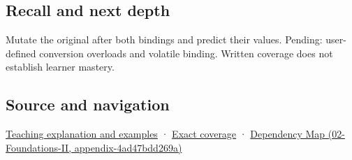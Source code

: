 \subsection{Recall and next depth}\label{recall-and-next-depth}

Mutate the original after both bindings and predict their values. Pending: user-defined conversion overloads and volatile binding. Written coverage does not establish learner mastery.

\subsection{Source and navigation}\label{source-and-navigation}

\href{Continuous\%20Notes/Computing\%20Foundations\%20-\%20From\%20Bits\%20to\%20C++\%20and\%20Systems\%20APIs\#Binding\%20chooses\%20a\%20referent,\%20not\%20always\%20the\%20one\%20you\%20imagined}{Teaching explanation and examples} · \hyperref[appendix-fd090d982a15]{Exact coverage} · \href{}{Dependency Map (02-Foundations-II, appendix-4ad47bdd269a)}

